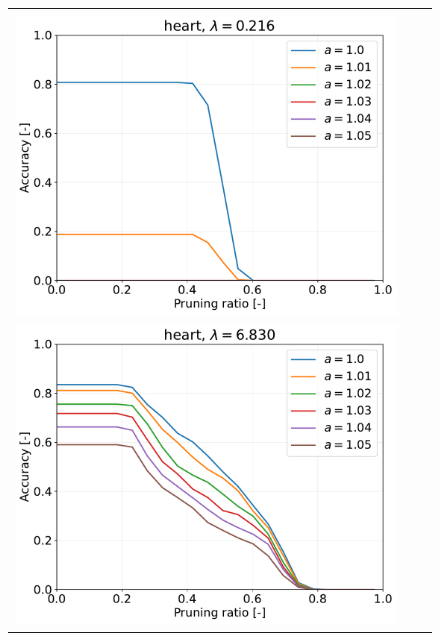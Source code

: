 \begin{figure}[H]
\begin{tabular}{ccc}
		\begin{minipage}[b]{0.3\hsize}\centering {\small Dataset: heart, $\lambda=n \cdot 10^{-3}$}\\\includegraphics[width=0.8\hsize]{fig/heart/kernel_ss_screening_rate_lam0.216_x_n_y_etest.pdf}\end{minipage}
		&
		\begin{minipage}[b]{0.3\hsize}\centering {\small Dataset: heart, $\lambda=n \cdot 10^{-1.5}$}\\\includegraphics[width=0.8\hsize]{fig/heart/kernel_ss_screening_rate_lam6.830_x_n_y_etest.pdf}\end{minipage}
		&

\end{tabular}
\end{figure}
